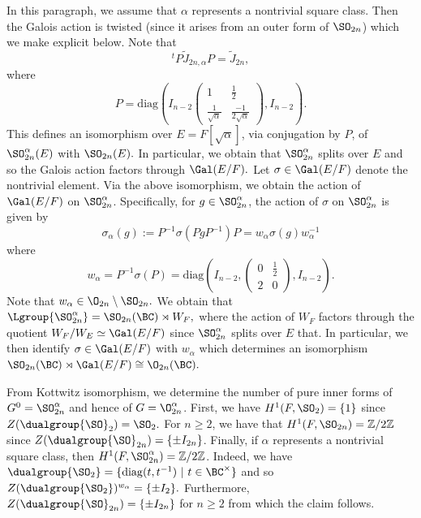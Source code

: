 \documentclass[11pt,letterpaper]{amsart}
\numberwithin{equation}{section}
\begin{document}
{In this paragraph, we assume that $\alpha$ represents a nontrivial square class. Then the Galois action is twisted (since it arises from an outer form of $\SO_{2n}$) which we make explicit below. Note that 
\[
{}^tP\tilde{J}_{2n,\alpha}P=\tilde{J}_{2n},
\]
where
\[
P=\mathrm{diag}(I_{n-2}\begin{pmatrix}
    1 & \frac{1}{2} \\
    \frac{1}{\sqrt{\alpha}} & \frac{-1}{2\sqrt{\alpha}}
\end{pmatrix}, I_{n-2}).
\]
This defines an isomorphism over $E=F[\sqrt{\alpha}]$, via conjugation by $P$, of $\SO_{2n}^\alpha(E)$ with $\SO_{2n}(E).$ In particular, we obtain that $\SO_{2n}^\alpha$ splits over $E$ and so the Galois action factors through $\Gal(E/F).$ Let $\sigma\in \Gal(E/F)$ denote the nontrivial element.
Via the above isomorphism, we obtain the action of $\Gal(E/F)$ on $\SO_{2n}^\alpha$. Specifically, for $g\in \SO_{2n}^\alpha$, the action of $\sigma$ on $\SO_{2n}^\alpha$ is given by
\[
\sigma_\alpha(g):=P^{-1}\sigma(PgP^{-1})P=w_\alpha\sigma(g)w_\alpha^{-1}
\]
where
\[
w_\alpha=P^{-1}\sigma(P)=\mathrm{diag}\left(
    I_{n-2},\begin{pmatrix}
     0 & \frac{1}{2} \\
     2 & 0
    \end{pmatrix}, I_{n-2}\right).
\]
Note that $w_\alpha\in \O_{2n} \setminus \SO_{2n}.$ We obtain that $\Lgroup{\SO_{2n}^\alpha}=\SO_{2n}(\BC)\rtimes W_F,$ where the action of $W_F$ factors through the quotient $W_F/W_E \simeq \Gal(E/F)$  since $\SO_{2n}^\alpha$ splits over $E$ that. In particular, we then identify $\sigma\in \Gal(E/F)$ with $w_\alpha$  which determines an isomorphism $\SO_{2n}(\BC)\rtimes\Gal(E/F)\cong\O_{2n}(\BC).$ 

From Kottwitz isomorphism, we determine the number of pure inner forms of $G^0 = \SO_{2n}^\alpha$ and hence of $G = \O_{2n}^\alpha$. First, we have $H^1(F,\SO_{2})=\{1\}$ since $Z(\dualgroup{\SO}_2)=\SO_{2}.$ For $n\geq 2$, we have that $H^1(F,\SO_{2n})=\mathbb{Z}/2\mathbb{Z}$ since $Z(\dualgroup{\SO}_{2n})=\{\pm I_{2n}\}$. Finally, if $\alpha$ represents a nontrivial square class, then $H^1(F,\SO_{2n}^\alpha)=\mathbb{Z}/2\mathbb{Z}$. Indeed, we have $\dualgroup{\SO_{2}}=\{\mathrm{diag}(t,t^{-1}) \ | \ t\in\BC^\times\}$ and so $Z(\dualgroup{\SO_2})^{w_\alpha}=\{\pm I_2\}.$ Furthermore,  $Z(\dualgroup{\SO}_{2n})=\{\pm I_{2n}\}$ for $n\geq 2$ from which the claim follows.

}
\end{document}
